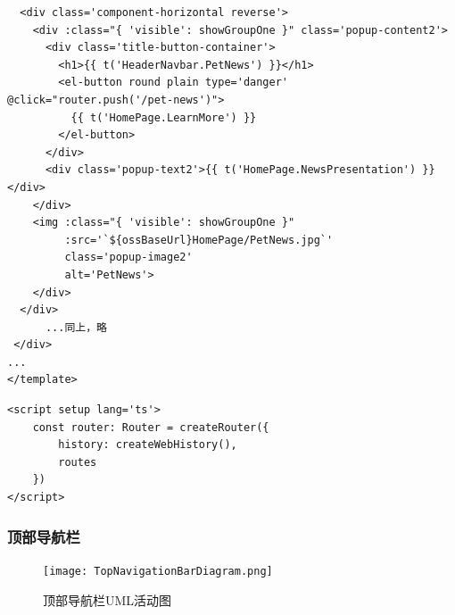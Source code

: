 \begin{itemize}
\begin{verbatim}
  <div class='component-horizontal reverse'>
    <div :class="{ 'visible': showGroupOne }" class='popup-content2'>
      <div class='title-button-container'>
        <h1>{{ t('HeaderNavbar.PetNews') }}</h1>
        <el-button round plain type='danger' @click="router.push('/pet-news')">
          {{ t('HomePage.LearnMore') }}
        </el-button>
      </div>
      <div class='popup-text2'>{{ t('HomePage.NewsPresentation') }}</div>
    </div>
    <img :class="{ 'visible': showGroupOne }"
         :src='`${ossBaseUrl}HomePage/PetNews.jpg`'
         class='popup-image2'
         alt='PetNews'>
    </div>
  </div>
      ...同上，略
 </div>
...
</template>
	\end{verbatim}
	
	\begin{verbatim}
<script setup lang='ts'>
	const router: Router = createRouter({
		history: createWebHistory(),
		routes
	})
</script>
	\end{verbatim}
\end{itemize}

\subsubsection{顶部导航栏}

\begin{figure}[H]
	\centering
	\texttt{[image: TopNavigationBarDiagram.png]} 
	\caption{顶部导航栏UML活动图}
	\label{fig:TopNavigationBarDiagram}
\end{figure}

